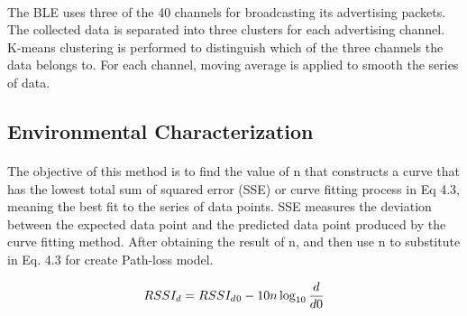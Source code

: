 \paragraph{}The BLE uses three of the 40 channels for broadcasting its advertising packets. The collected data is separated into three clusters for each advertising channel. K-means clustering is performed to distinguish which of the three channels the data belongs to. For each channel, moving average is applied to
smooth the series of data.

\subsection{Environmental Characterization}
\paragraph{}The objective of this method is to find the value of n that constructs a curve that has the lowest total sum of squared error (SSE) or curve fitting process in Eq 4.3, meaning the best fit to the series of data points. SSE measures the deviation between the expected data point and the predicted data point produced by the curve fitting method. After obtaining the result of n, and then use n to substitute in Eq. 4.3 for create Path-loss model.

\begin{equation}
RSSI_d = RSSI_d\textsubscript{0}-10n\log_{10}\frac{d}{d0}
\label{fig:eqt3}
\end{equation}

